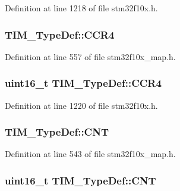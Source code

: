 Definition at line 1218 of file stm32f10x.\+h.

\subsubsection[{\texorpdfstring{C\+C\+R4}{CCR4}}]{ T\+I\+M\+\_\+\+Type\+Def\+::\+C\+C\+R4}\hypertarget{struct_t_i_m___type_def_a6f1c46967f373d536410446bf6ba5e5a}{}\label{struct_t_i_m___type_def_a6f1c46967f373d536410446bf6ba5e5a}


Definition at line 557 of file stm32f10x\+\_\+map.\+h.

\subsubsection[{\texorpdfstring{C\+C\+R4}{CCR4}}]{ {\bf uint16\+\_\+t} T\+I\+M\+\_\+\+Type\+Def\+::\+C\+C\+R4}\hypertarget{struct_t_i_m___type_def_a858fde116b024a952326715731650bc2}{}\label{struct_t_i_m___type_def_a858fde116b024a952326715731650bc2}


Definition at line 1220 of file stm32f10x.\+h.

\subsubsection[{\texorpdfstring{C\+NT}{CNT}}]{ T\+I\+M\+\_\+\+Type\+Def\+::\+C\+NT}\hypertarget{struct_t_i_m___type_def_a2f8bd9eb0cb551cf789ff6f4d49fab61}{}\label{struct_t_i_m___type_def_a2f8bd9eb0cb551cf789ff6f4d49fab61}


Definition at line 543 of file stm32f10x\+\_\+map.\+h.

\subsubsection[{\texorpdfstring{C\+NT}{CNT}}]{ {\bf uint16\+\_\+t} T\+I\+M\+\_\+\+Type\+Def\+::\+C\+NT}\hypertarget{struct_t_i_m___type_def_ad6920b90862a061dd50b13760cb07e68}{}\label{struct_t_i_m___type_def_ad6920b90862a061dd50b13760cb07e68}


